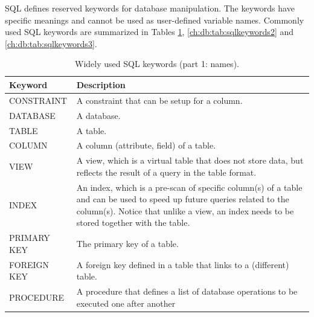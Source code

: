 SQL defines reserved keywords for database manipulation. The keywords have specific meanings and cannot be used as user-defined variable names. Commonly used SQL keywords are summarized in Tables \ref{ch:db:tab:sqlkeywords1}, \ref{ch:db:tab:sqlkeywords2} and \ref{ch:db:tab:sqlkeywords3}.

\begin{table}[!htb]
	\centering \caption{Widely used SQL keywords (part 1: names).}\label{ch:db:tab:sqlkeywords1}
	\begin{tabularx}{\textwidth}{lX}
		\hline
		Keyword & Description \\ \hline
		CONSTRAINT & A constraint that can be setup for a column. \\ 
		DATABASE & A database. \\ 
		TABLE & A table. \\ 
		COLUMN & A column (attribute, field) of a table. \\ 
		VIEW & A view, which is a virtual table that does not store data, but reflects the result of a query in the table format. \\ 
		INDEX & An index, which is a pre-scan of specific column(s) of a table and can be used to speed up future queries related to the column(s). Notice that unlike a view, an index needs to be stored together with the table. \\ 
		PRIMARY KEY & The primary key of a table. \\ 
		FOREIGN KEY & A foreign key defined in a table that links to a (different) table. \\ 
		PROCEDURE & A procedure that defines a list of database operations to be executed one after another \\ \hline
	\end{tabularx}
\end{table}

